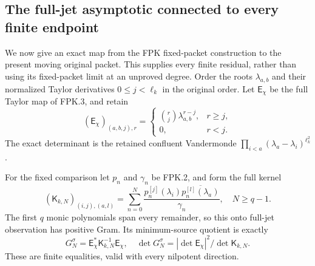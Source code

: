 \documentclass[11pt,a4paper]{article}
\begin{document}

\subsection{The full-jet asymptotic connected to every finite endpoint}

We now give an exact map from the FPK fixed-packet construction to
the present moving original packet. This supplies every finite
residual, rather than using its fixed-packet limit at an unproved
degree. Order the roots $\lambda_{a,b}$ and their normalized
Taylor derivatives $0\le j<\ell_k$ in the original order. Let
$\mathsf E_\chi$ be the full Taylor map of FPK.3, and retain
\[
(\mathsf E_\chi)_{(a,b,j),r}
=\begin{cases}\binom rj\lambda_{a,b}^{r-j},&r\ge j,\\0,&r<j.
\end{cases}
\]
The exact determinant is the retained confluent Vandermonde
$\prod_{i<a}(\lambda_a-\lambda_i)^{\ell_k^2}$.

For the fixed comparison let $p_n$ and $\gamma_n$ be FPK.2, and
form the full kernel
\[
(\mathsf K_{k,N})_{(i,j),(a,l)}
=\sum_{n=0}^N\frac{p_n^{[j]}(\lambda_i)
                         \overline{p_n^{[l]}(\lambda_a)}}{\gamma_n},
\quad N\ge q-1.
\tag{TWA18}
\]
The first $q$ monic polynomials span every remainder, so this
onto full-jet observation has positive Gram. Its minimum-source
quotient is exactly
\[
G_N^\sigma=\mathsf E_\chi^*\mathsf K_{k,N}^{-1}\mathsf E_\chi,
\quad
\det G_N^\sigma=|\det\mathsf E_\chi|^2/\det\mathsf K_{k,N}.
\tag{TWA19}
\]
These are finite equalities, valid with every nilpotent direction.
\end{document}
